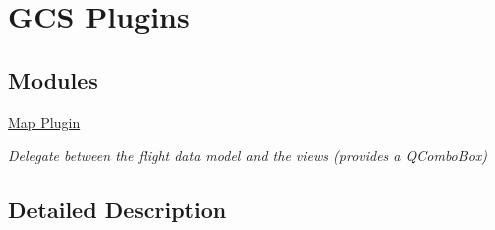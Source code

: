 \hypertarget{group___tau_labs}{\section{G\-C\-S Plugins}
\label{group___tau_labs}
}
\subsection*{Modules}
\begin{DoxyCompactItemize}
\item 
\hyperlink{group___path_planner}{Map Plugin}
\begin{DoxyCompactList}\small\item\em Delegate between the flight data model and the views (provides a Q\-Combo\-Box) \end{DoxyCompactList}\end{DoxyCompactItemize}


\subsection{Detailed Description}
